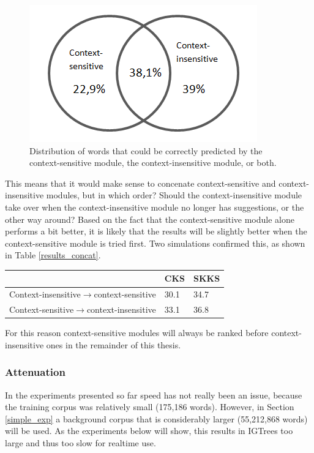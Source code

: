\documentclass[11pt]{article}
\let\originaltable\table
\let\endoriginaltable\endtable
\renewenvironment{table}[1][ht]{%
  \originaltable[#1]
  \centering}%
  {\endoriginaltable}
\begin{document}
\begin{figure}[H] \centering
\includegraphics[scale=1]{venn}
\caption{Distribution of words that could be correctly predicted by the context-sensitive module, the context-insensitive module, or both.}
\label{venn}
\end{figure} 

This means that it would make sense to concenate context-sensitive and context-insensitive modules, but in which order? Should the context-insensitive module take over when the context-insensitive module no longer has suggestions, or the other way around? Based on the fact that the context-sensitive module alone performs a bit better, it is likely that the results will be slightly better when the context-sensitive module is tried first. Two simulations confirmed this, as shown in Table \ref{results_concat}.

\begin{table}[h]
\begin{tabular}{l|ll} 
&CKS&SKKS\\
\hline
Context-insensitive$\rightarrow$context-sensitive&30.1&34.7\\
Context-sensitive$\rightarrow$context-insensitive&33.1&36.8\\
\end{tabular} 
\caption{Percentage of keystrokes Soothsayer saves with a context-sensitive module first and a context-insensitive module first} \label{results_concat}
\end{table}

For this reason context-sensitive modules will always be ranked before context-insensitive ones in the remainder of this thesis.

\subsubsection{Attenuation}

In the experiments presented so far speed has not really been an issue, because the training corpus was relatively small (175,186 words). However, in Section \ref{simple_exp} a background corpus that is considerably larger (55,212,868 words) will be used. As the experiments below will show, this results in IGTrees too large and thus too slow for realtime use.
\end{document}
